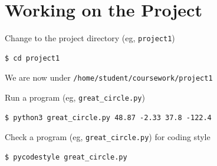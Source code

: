 \documentclass[8pt,a4paper,compress]{beamer}
\begin{document}
\section{Working on the Project}
\begin{frame}[fragile]
\pause\transdissolve

Change to the project directory (eg, \lstinline{project1})

\begin{tcolorbox}[enhanced,drop shadow southwest,sharp corners,size=fbox,colback=black]
\begin{lstlisting}[style=terminal]
$ cd project1
\end{lstlisting}
\end{tcolorbox}

\pause\transdissolve\bigskip

We are now under \lstinline{/home/student/coursework/project1}

\pause\transdissolve\bigskip

Run a program (eg, \lstinline{great_circle.py})

\begin{tcolorbox}[enhanced,drop shadow southwest,sharp corners,size=fbox,colback=black]
\begin{lstlisting}[style=terminal]
$ python3 great_circle.py 48.87 -2.33 37.8 -122.4
\end{lstlisting}
\end{tcolorbox}

\pause\transdissolve\bigskip

Check a program (eg, \lstinline{great_circle.py}) for coding style

\begin{tcolorbox}[enhanced,drop shadow southwest,sharp corners,size=fbox,colback=black]
\begin{lstlisting}[style=terminal]
$ pycodestyle great_circle.py
\end{lstlisting}
\end{tcolorbox}
\end{frame}
\end{document}
